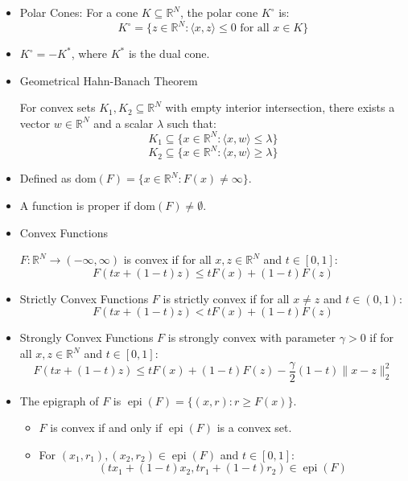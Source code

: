 \documentclass{article}
\begin{document}
\begin{itemize}
\item Polar Cones:
For a cone \( K \subseteq \mathbb{R}^N \), the polar cone \( K^\circ \) is:
\[
K^\circ = \{ z \in \mathbb{R}^N : \langle x, z \rangle \leq 0 \text{ for all } x \in K \}
\]

\item \( K^\circ = -K^* \), where \( K^* \) is the dual cone.


\item Geometrical Hahn-Banach Theorem

For convex sets \( K_1, K_2 \subseteq \mathbb{R}^N \) with empty interior intersection, there exists a vector \( w \in \mathbb{R}^N \) and a scalar \( \lambda \) such that:
\[
K_1 \subseteq \{ x \in \mathbb{R}^N : \langle x, w \rangle \leq \lambda \}
\]
\[
K_2 \subseteq \{ x \in \mathbb{R}^N : \langle x, w \rangle \geq \lambda \}
\]


\item Defined as $\text{dom}(F) = \{x \in \mathbb{R}^N : F(x) \neq \infty\}$.

\item A function is proper if $\text{dom}(F) \neq \emptyset$.

\item Convex Functions

\( F : \mathbb{R}^N \to (-\infty, \infty) \) is convex if for all \( x, z \in \mathbb{R}^N \) and \( t \in [0, 1] \):
\[
F(tx + (1 - t)z) \leq tF(x) + (1 - t)F(z)
\]

\item Strictly Convex Functions
\( F \) is strictly convex if for all \( x \neq z \) and \( t \in (0,1) \):
\[
F(tx + (1 - t)z) < tF(x) + (1 - t)F(z)
\]

\item Strongly Convex Functions
\( F \) is strongly convex with parameter \( \gamma > 0 \) if for all \( x, z \in \mathbb{R}^N \) and \( t \in [0, 1] \):
\[
F(tx + (1 - t)z) \leq tF(x) + (1 - t)F(z) - \frac{\gamma}{2}(1 - t)\|x - z\|_2^2
\]

\item 
The epigraph of $F$ is $\operatorname{epi}(F) = \{(x, r) : r \geq F(x)\}$.

\begin{itemize}
        \item $F$ is convex if and only if $\operatorname{epi}(F)$ is a convex set.
        \item For $(x_1, r_1), (x_2, r_2) \in \operatorname{epi}(F)$ and $t \in [0, 1]$:
        \[
        (tx_1 + (1 - t)x_2, tr_1 + (1 - t)r_2) \in \operatorname{epi}(F)
        \]
    \end{itemize}


\end{itemize}
\end{document}
